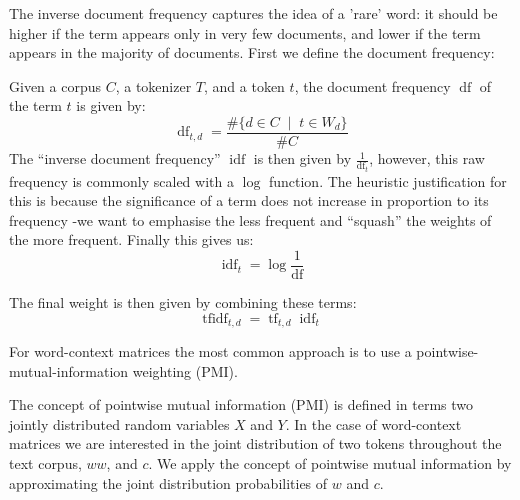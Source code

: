 \begin{definition}
  The inverse document frequency captures the idea of a 'rare' word: it should be higher if the term appears only in very few documents, and lower if the term appears in the majority of documents. First we define the document frequency:

  Given a corpus $C$, a tokenizer $T$, and a token $t$, the document frequency $\operatorname{df}$ of the term $t$ is given by:
  \begin{equation}
    \operatorname{df}_{t,d}=\frac{\#\{d\in C\;\mid\;t\in W_d\}}{\#C}
  \end{equation}
  The ``inverse document frequency'' $\operatorname{idf}$ is then given by $\frac{1}{\operatorname{df}_t}$, however, this raw frequency is commonly scaled with a $\log$ function. The heuristic justification for this is because the significance of a term does not increase in proportion to its frequency -we want to emphasise the less frequent and ``squash'' the weights of the more frequent. Finally this gives us:
  \begin{equation}
    \operatorname{idf}_t=\log\frac{1}{\operatorname{df}}
  \end{equation}
\end{definition}

\begin{definition}
  The final weight is then given by combining these terms:
  \begin{equation}
    \operatorname{tfidf}_{t,d}=\operatorname{tf}_{t,d}\operatorname{idf}_t
  \end{equation}
\end{definition}

For word-context matrices the most common approach is to use a pointwise-mutual-information weighting (PMI).

The concept of pointwise mutual information (PMI) is defined in terms two jointly distributed random variables $X$ and $Y$. In the case of word-context matrices we are interested in the joint distribution of two tokens throughout the text corpus, $ww$, and $c$. We apply the concept of pointwise mutual information by approximating the joint distribution probabilities of $w$ and $c$.

